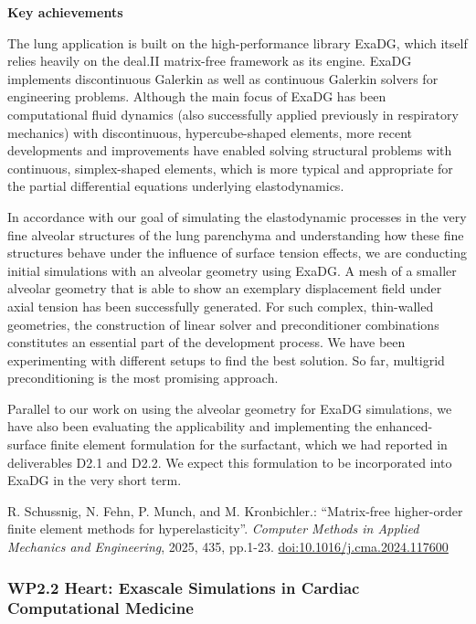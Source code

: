 \documentclass[a4paper,12pt, numbers]{article}
\begin{document}
\noindent\textbf{Key achievements}

The lung application is built on the high-performance library ExaDG, which itself relies heavily on the deal.II matrix-free framework as its engine. ExaDG implements discontinuous Galerkin as well as continuous Galerkin solvers for engineering problems. Although the main focus of ExaDG has been computational fluid dynamics (also successfully applied previously in respiratory mechanics) with discontinuous, hypercube-shaped elements, more recent developments and improvements \citep{schussnig2025matrixfree} have enabled solving structural problems with continuous, simplex-shaped elements, which is more typical and appropriate for the partial differential equations underlying elastodynamics.

In accordance with our goal of simulating the elastodynamic processes in the very fine alveolar structures of the lung parenchyma and understanding how these fine structures behave under the influence of surface tension effects, we are conducting initial simulations with an alveolar geometry using ExaDG. A mesh of a smaller alveolar geometry that is able to show an exemplary displacement field under axial tension has been successfully generated. For such complex, thin-walled geometries, the construction of linear solver and preconditioner combinations constitutes an essential part of the development process. We have been experimenting with different setups to find the best solution. So far, multigrid preconditioning is the most promising approach.

Parallel to our work on using the alveolar geometry for ExaDG simulations, we have also been evaluating the applicability and implementing the enhanced-surface finite element formulation for the surfactant, which we had reported in deliverables D2.1 and D2.2. We expect this formulation to be incorporated into ExaDG in the very short term.

\begin{thebibliography}{10}
 R. Schussnig, N. Fehn, P. Munch, and M. Kronbichler.: ``Matrix-free higher-order finite element methods for hyperelasticity''. \emph{Computer Methods in Applied Mechanics and Engineering}, 2025, 435,
pp.1-23. \href{https://doi.org/10.1016/j.cma.2024.117600}{doi:10.1016/j.cma.2024.117600}
\end{thebibliography}

\subsubsection*{WP2.2 Heart: Exascale Simulations in Cardiac Computational Medicine}
\end{document}

